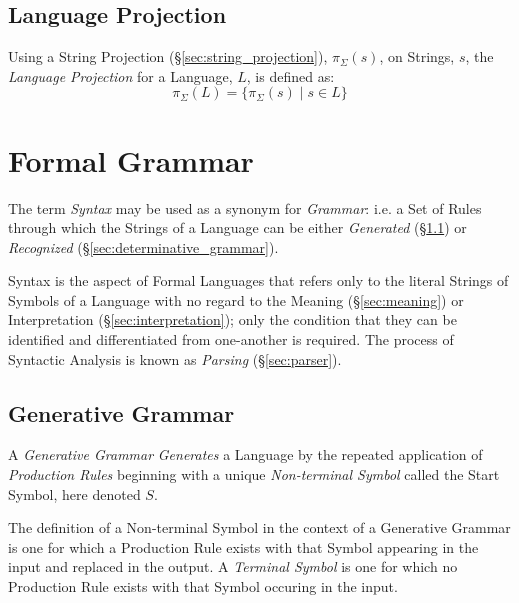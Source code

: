 \subsection{Language Projection}\label{sec:language_projection}

Using a String Projection (\S\ref{sec:string_projection}),
$\pi_{\Sigma}(s)$, on Strings, $s$, the \emph{Language Projection} for
a Language, $L$, is defined as:
\[
  \pi_{\Sigma}(L) = \{\pi_{\Sigma}(s)\;|\; s \in L\}
\]



\section{Formal Grammar}\label{sec:formal_grammar}

The term \emph{Syntax} may be used as a synonym for \emph{Grammar}:
i.e. a Set of Rules through which the Strings of a Language can be
either \emph{Generated} (\S\ref{sec:generative_grammar}) or
\emph{Recognized} (\S\ref{sec:determinative_grammar}).

Syntax is the aspect of Formal Languages that refers only to the
literal Strings of Symbols of a Language with no regard to the Meaning
(\S\ref{sec:meaning}) or Interpretation (\S\ref{sec:interpretation});
only the condition that they can be identified and differentiated from
one-another is required. The process of Syntactic Analysis is known as
\emph{Parsing} (\S\ref{sec:parser}).



\subsection{Generative Grammar}\label{sec:generative_grammar}

A \emph{Generative Grammar} \emph{Generates} a Language by the
repeated application of \emph{Production Rules} beginning with a
unique \emph{Non-terminal Symbol} called the Start Symbol, here
denoted $S$.

The definition of a Non-terminal Symbol in the context of a Generative
Grammar is one for which a Production Rule exists with that Symbol
appearing in the input and replaced in the output. A \emph{Terminal
  Symbol} is one for which no Production Rule exists with that Symbol
occuring in the input.

